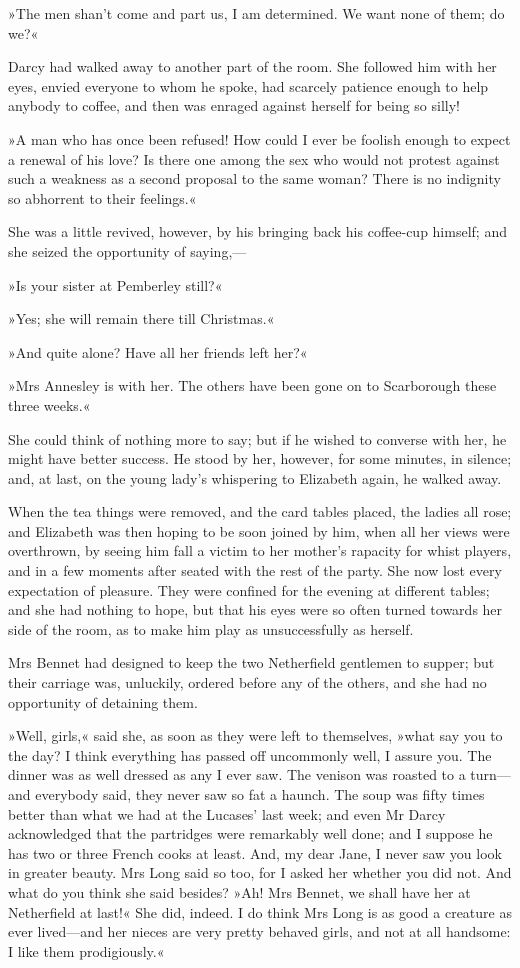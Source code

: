 »The men shan't come and part us, I am determined. We want none of them; do we?«

Darcy had walked away to another part of the room. She followed him with her eyes, envied everyone to whom he spoke, had scarcely patience enough to help anybody to coffee, and then was enraged against herself for being so silly!

»A man who has once been refused! How could I ever be foolish enough to expect a renewal of his love? Is there one among the sex who would not protest against such a weakness as a second proposal to the same woman? There is no indignity so abhorrent to their feelings.«

She was a little revived, however, by his bringing back his coffee-cup himself; and she seized the opportunity of saying,—

»Is your sister at Pemberley still?«

»Yes; she will remain there till Christmas.«

»And quite alone? Have all her friends left her?«

»Mrs Annesley is with her. The others have been gone on to Scarborough these three weeks.«

She could think of nothing more to say; but if he wished to converse with her, he might have better success. He stood by her, however, for some minutes, in silence; and, at last, on the young lady's whispering to Elizabeth again, he walked away.

When the tea things were removed, and the card tables placed, the ladies all rose; and Elizabeth was then hoping to be soon joined by him, when all her views were overthrown, by seeing him fall a victim to her mother's rapacity for whist players, and in a few moments after seated with the rest of the party. She now lost every expectation of pleasure. They were confined for the evening at different tables; and she had nothing to hope, but that his eyes were so often turned towards her side of the room, as to make him play as unsuccessfully as herself.

Mrs Bennet had designed to keep the two Netherfield gentlemen to supper; but their carriage was, unluckily, ordered before any of the others, and she had no opportunity of detaining them.

»Well, girls,« said she, as soon as they were left to themselves, »what say you to the day? I think everything has passed off uncommonly well, I assure you. The dinner was as well dressed as any I ever saw. The venison was roasted to a turn—and everybody said, they never saw so fat a haunch. The soup was fifty times better than what we had at the Lucases' last week; and even Mr Darcy acknowledged that the partridges were remarkably well done; and I suppose he has two or three French cooks at least. And, my dear Jane, I never saw you look in greater beauty. Mrs Long said so too, for I asked her whether you did not. And what do you think she said besides? »Ah! Mrs Bennet, we shall have her at Netherfield at last!« She did, indeed. I do think Mrs Long is as good a creature as ever lived—and her nieces are very pretty behaved girls, and not at all handsome: I like them prodigiously.«

